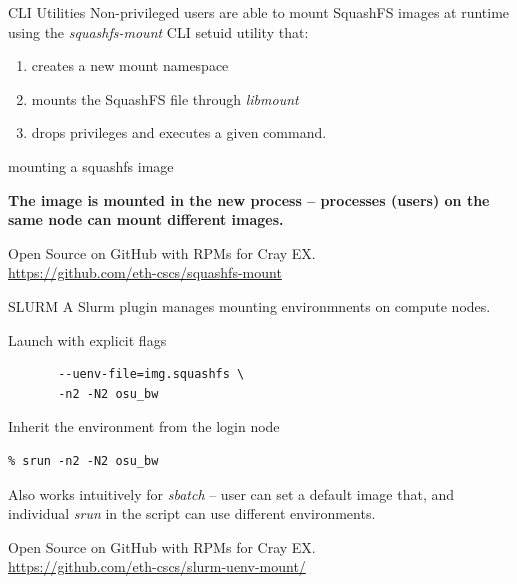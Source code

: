 \documentclass[aspectratio=43]{beamer}
\begin{document}
\begin{frame}[fragile]{CLI Utilities}
    Non-privileged users are able to mount SquashFS images at runtime using the \emph{squashfs-mount} CLI setuid utility that:
    \begin{enumerate}
    \item creates a new mount namespace
    \item mounts the SquashFS file through \emph{libmount}
    \item drops privileges and executes a given command.
    \end{enumerate}

    \begin{code}{mounting a squashfs image}

    \end{code}

    \begin{center}
        \textbf{The image is mounted in the new process -- processes (users) on the same node can mount different images.}
    \end{center}

    \vspace{10pt}

    Open Source on GitHub with RPMs for Cray EX.\\\url{https://github.com/eth-cscs/squashfs-mount}
\end{frame}

\begin{frame}[fragile]{SLURM}
    A Slurm plugin manages mounting environmnents on compute nodes.
    \begin{code}{Launch with explicit flags}
            \begin{lstlisting}[style=talkbash]
% srun --uenv-mount=/user-environment \
       --uenv-file=img.squashfs \
       -n2 -N2 osu_bw
            \end{lstlisting}
    \end{code}
    \begin{code}{Inherit the environment from the login node}
            \begin{lstlisting}[style=talkbash]
% squashfs-mount img.squashfs /user-environment bash
% srun -n2 -N2 osu_bw
            \end{lstlisting}
    \end{code}

    Also works intuitively for \emph{sbatch} -- user can set a default image that, and individual \emph{srun} in the script can use different environments.

    Open Source on GitHub with RPMs for Cray EX.\\\url{https://github.com/eth-cscs/slurm-uenv-mount/}
\end{frame}
\end{document}
